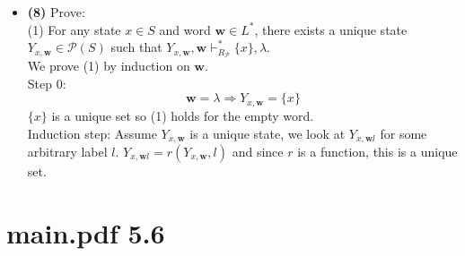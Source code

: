 \documentclass[defaultpackages]{simplereport}
\newcommand{\powerset}[1]{\mathcal{P}(#1)}
\begin{document}
\begin{itemize}[label=]
  \item \textbf{(8)} Prove:\\(1) For any state $x \in S$ and word $\bm{w} \in
    L^*$, there exists a unique state $Y_{x,\bm{w}} \in \powerset{S}$ such that
    $Y_{x,\bm{w}}, \bm{w} \vdash^*_{R_\mathcal{P}} \{x\}, \lambda$.\\
    We prove (1) by induction on $\bm{w}$.\\
    Step 0:\[\bm{w} = \lambda \Rightarrow Y_{x, \bm{w}} = \{x\}\]
    $\{x\}$ is a unique set so (1) holds for the empty word.\\
    Induction step: Assume $Y_{x, \bm{w}}$ is a unique state, we look at $Y_{x,
      \bm{w}l}$ for some arbitrary label $l$. $Y_{x,\bm{w}l} = r(Y_{x,\bm{w}},
    l)$ and since $r$ is a function, this is a unique set.
  \end{itemize}
  \section*{main.pdf 5.6}
  
\end{document}
